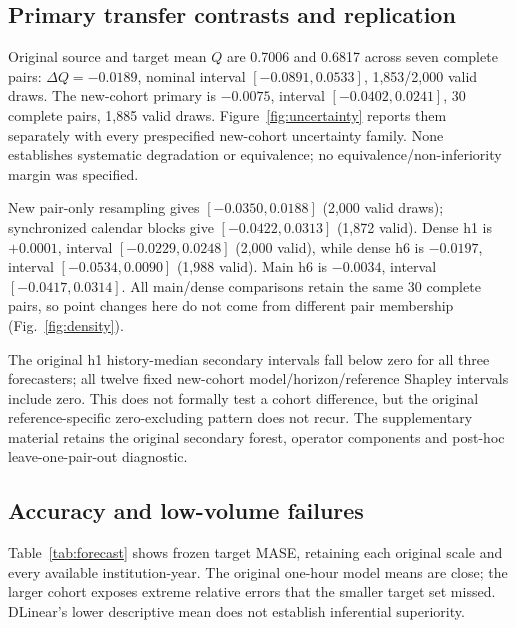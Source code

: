 \documentclass[conference]{IEEEtran}
\begin{document}
\subsection{Primary transfer contrasts and replication}
Original source and target mean $Q$ are 0.7006 and 0.6817 across seven complete pairs: $\Delta Q=-0.0189$, nominal interval $[-0.0891,0.0533]$, 1,853/2,000 valid draws. The new-cohort primary is $-0.0075$, interval $[-0.0402,0.0241]$, 30 complete pairs, 1,885 valid draws. Figure~\ref{fig:uncertainty} reports them separately with every prespecified new-cohort uncertainty family. None establishes systematic degradation or equivalence; no equivalence/non-inferiority margin was specified.



New pair-only resampling gives $[-0.0350,0.0188]$ (2,000 valid draws); synchronized calendar blocks give $[-0.0422,0.0313]$ (1,872 valid). Dense h1 is $+0.0001$, interval $[-0.0229,0.0248]$ (2,000 valid), while dense h6 is $-0.0197$, interval $[-0.0534,0.0090]$ (1,988 valid). Main h6 is $-0.0034$, interval $[-0.0417,0.0314]$. All main/dense comparisons retain the same 30 complete pairs, so point changes here do not come from different pair membership (Fig.~\ref{fig:density}).



The original h1 history-median secondary intervals fall below zero for all three forecasters; all twelve fixed new-cohort model/horizon/reference Shapley intervals include zero. This does not formally test a cohort difference, but the original reference-specific zero-excluding pattern does not recur. The supplementary material retains the original secondary forest, operator components and post-hoc leave-one-pair-out diagnostic.

\subsection{Accuracy and low-volume failures}
Table~\ref{tab:forecast} shows frozen target MASE, retaining each original scale and every available institution-year. The original one-hour model means are close; the larger cohort exposes extreme relative errors that the smaller target set missed. DLinear's lower descriptive mean does not establish inferential superiority.
\end{document}
